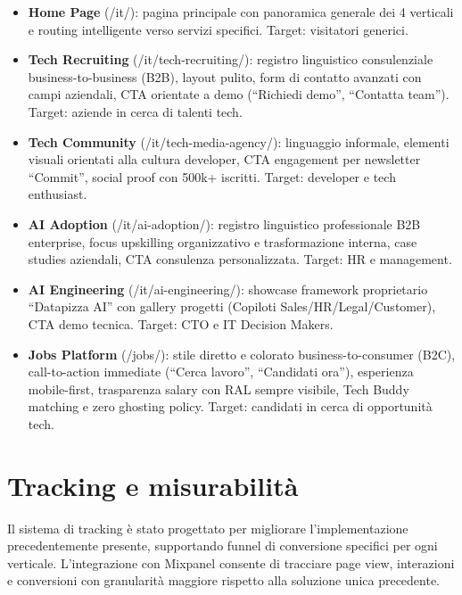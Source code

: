 \begin{itemize}
  \item \textbf{Home Page} (/it/): pagina principale con panoramica generale 
  dei 4 verticali e routing intelligente verso servizi specifici. Target: 
  visitatori generici.
  
  \item \textbf{Tech Recruiting} (/it/tech-recruiting/): registro linguistico 
  consulenziale business-to-business (B2B), layout pulito, form di contatto 
  avanzati con campi aziendali, CTA orientate a demo (``Richiedi demo'', 
  ``Contatta team''). Target: aziende in cerca di talenti tech.
  
  \item \textbf{Tech Community} (/it/tech-media-agency/): linguaggio informale, 
  elementi visuali orientati alla cultura developer, CTA engagement per newsletter 
  ``Commit'', social proof con 500k+ iscritti. Target: developer e tech enthusiast.
  
  \item \textbf{AI Adoption} (/it/ai-adoption/): registro linguistico professionale 
  B2B enterprise, focus upskilling organizzativo e trasformazione interna, case 
  studies aziendali, CTA consulenza personalizzata. Target: HR e management.
  
  \item \textbf{AI Engineering} (/it/ai-engineering/): showcase framework 
  proprietario ``Datapizza AI'' con gallery progetti (Copiloti Sales/HR/Legal/Customer), 
  CTA demo tecnica. Target: CTO e IT Decision Makers.
  
  \item \textbf{Jobs Platform} (/jobs/): stile diretto e colorato 
  business-to-consumer (B2C), call-to-action immediate (``Cerca lavoro'', 
  ``Candidati ora''), esperienza mobile-first, trasparenza salary con RAL sempre 
  visibile, Tech Buddy matching e zero ghosting policy. Target: candidati in cerca 
  di opportunità tech.
\end{itemize}

\section{Tracking e misurabilità}
Il sistema di tracking è stato progettato per migliorare l'implementazione 
precedentemente presente, supportando funnel di conversione specifici per ogni 
verticale. L'integrazione con Mixpanel consente di tracciare page view, 
interazioni e conversioni con granularità maggiore rispetto alla soluzione unica 
precedente.

